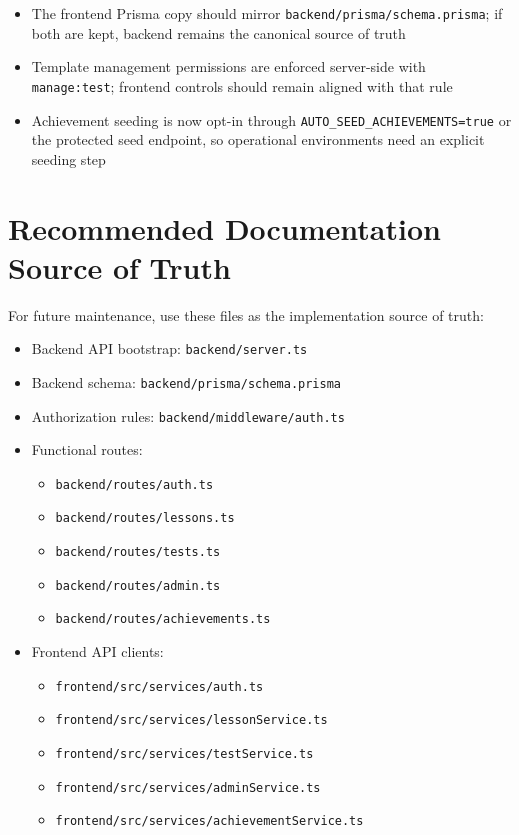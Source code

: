 \documentclass[11pt,a4paper]{article}
\newcommand{\docpath}[1]{\texttt{#1}}
\begin{document}
\begin{itemize}[leftmargin=1.5em]
  \item The frontend Prisma copy should mirror \docpath{backend/prisma/schema.prisma}; if both are kept, backend remains the canonical source of truth
  \item Template management permissions are enforced server-side with \docpath{manage:test}; frontend controls should remain aligned with that rule
  \item Achievement seeding is now opt-in through \docpath{AUTO\_SEED\_ACHIEVEMENTS=true} or the protected seed endpoint, so operational environments need an explicit seeding step
\end{itemize}

\section{Recommended Documentation Source of Truth}

For future maintenance, use these files as the implementation source of truth:
\begin{itemize}[leftmargin=1.5em]
  \item Backend API bootstrap: \docpath{backend/server.ts}
  \item Backend schema: \docpath{backend/prisma/schema.prisma}
  \item Authorization rules: \docpath{backend/middleware/auth.ts}
  \item Functional routes:
  \begin{itemize}[leftmargin=2em]
    \item \docpath{backend/routes/auth.ts}
    \item \docpath{backend/routes/lessons.ts}
    \item \docpath{backend/routes/tests.ts}
    \item \docpath{backend/routes/admin.ts}
    \item \docpath{backend/routes/achievements.ts}
  \end{itemize}
  \item Frontend API clients:
  \begin{itemize}[leftmargin=2em]
    \item \docpath{frontend/src/services/auth.ts}
    \item \docpath{frontend/src/services/lessonService.ts}
    \item \docpath{frontend/src/services/testService.ts}
    \item \docpath{frontend/src/services/adminService.ts}
    \item \docpath{frontend/src/services/achievementService.ts}
  \end{itemize}
\end{itemize}
\end{document}
